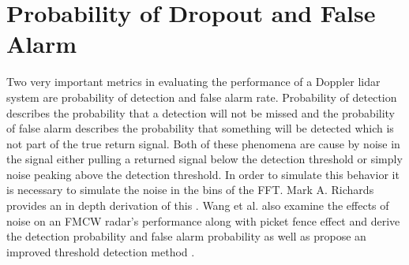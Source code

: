 \section{Probability of Dropout and False Alarm}
Two very important metrics in evaluating the performance of a Doppler lidar system are probability
of detection and false alarm rate. Probability of detection describes the probability that a detection
will not be missed and the probability of false alarm describes the probability that something will be
detected which is not part of the true return signal. Both of these phenomena are cause by noise in the signal
either pulling a returned signal below the detection threshold or simply noise peaking above the detection 
threshold. In order to simulate this behavior it is necessary to simulate the noise in the bins of the FFT. Mark A. Richards
provides an in depth derivation of this \cite{richards2007dftnoise}. Wang et al. also examine the effects
of noise on an FMCW radar's performance along with picket fence effect and derive the detection probability
and false alarm probability as well as propose an improved threshold detection method \cite{wangThresh}. 